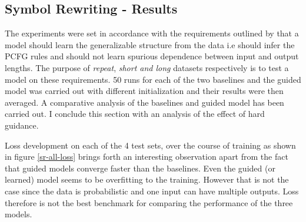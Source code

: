 \subsection{Symbol Rewriting - Results}
The experiments were set in accordance with the requirements outlined by \cite{Weber2018} that a model should learn the generalizable structure from the data i.e should infer the PCFG rules and should not learn spurious dependence between input and output lengths. The purpose of \textit{repeat}, \textit{short and long} datasets respectively is to test a model on these requirements. 50 runs for each of the two baselines and the guided model was carried out with different initialization and their results were then averaged. A comparative analysis of the baselines and guided model has been carried out. I conclude this section with an analysis of the effect of hard guidance.

Loss development on each of the 4 test sets, over the course of training as shown in figure \ref{sr-all-loss} brings forth an interesting observation apart from the fact that guided models converge faster than the baselines. Even the guided (or learned) model seems to be overfitting to the training. However that is not the case since the data is probabilistic and one input can have multiple outputs. Loss therefore is not the best benchmark for comparing the performance of the three models.

